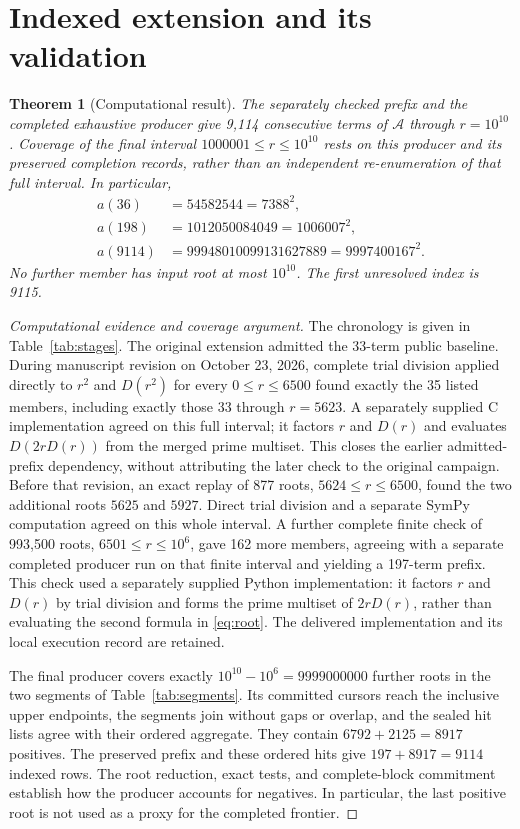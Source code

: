\documentclass[11pt]{article}
\newtheorem{theorem}{Theorem}[section]
\theoremstyle{definition}
\theoremstyle{remark}
\begin{document}
\section{Indexed extension and its validation}\label{sec:results}
\begin{theorem}[Computational result]\label{thm:computed}
The separately checked prefix and the completed exhaustive producer
give 9,114 consecutive terms of $\mathcal A$ through $r=10^{10}$.
Coverage of the final interval $1000001\leq r\leq10^{10}$ rests on
this producer and its preserved completion records, rather than an
independent re-enumeration of that full interval.
In particular,
\begin{align*}
 a(36)&=54582544=7388^{2},\\
 a(198)&=1012050084049=1006007^{2},\\
 a(9114)&=99948010099131627889=9997400167^{2}.
\end{align*}
No further member has input root at most $10^{10}$. The first unresolved
index is 9115.
\end{theorem}
\begin{proof}[Computational evidence and coverage argument]
The chronology is given in Table~\ref{tab:stages}. The original extension
admitted the 33-term public baseline. During manuscript revision on
October 23, 2026, complete trial division applied directly to $r^{2}$
and $D(r^{2})$ for every $0\leq r\leq6500$ found exactly the 35
listed members, including exactly those 33 through $r=5623$. A separately
supplied C implementation agreed on this full interval; it factors
$r$ and $D(r)$ and evaluates $D(2rD(r))$ from the merged prime multiset.
This closes the earlier admitted-prefix dependency, without attributing
the later check to the original campaign. Before that revision, an exact replay of
877 roots, $5624\leq r\leq6500$, found the two additional roots
$5625$ and $5927$. Direct trial division and a separate SymPy
computation agreed on this whole interval. A further complete finite
check of 993,500 roots, $6501\leq r\leq10^{6}$, gave 162 more members,
agreeing with a separate completed producer run on that finite
interval and yielding a 197-term prefix. This check
used a separately supplied Python implementation: it factors $r$
and $D(r)$ by trial division and forms the prime multiset of
$2rD(r)$, rather than evaluating the second formula in \eqref{eq:root}.
The delivered implementation and its local execution record are retained.

The final producer covers exactly $10^{10}-10^{6}=9999000000$ further
roots in the two segments of Table~\ref{tab:segments}. Its committed
cursors reach the inclusive upper endpoints, the segments join without
gaps or overlap, and the sealed hit lists agree with their ordered
aggregate. They contain $6792+2125=8917$ positives. The preserved prefix
and these ordered hits give $197+8917=9114$ indexed rows. The root
reduction, exact tests, and complete-block commitment establish how the
producer accounts for negatives. In particular, the last positive root
is not used as a proxy for the completed frontier.
\end{proof}
\end{document}
